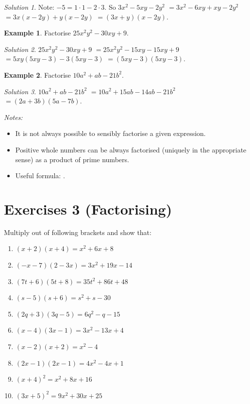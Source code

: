\documentclass[
  english,
  12pt,
  oneside]{book}
\providecommand{\tightlist}{%
  \setlength{\itemsep}{0pt}\setlength{\parskip}{0pt}}
\theoremstyle{definition}
\theoremstyle{definition}
\newtheorem{example}{Example}[chapter]
\theoremstyle{definition}
\theoremstyle{definition}
\theoremstyle{remark}
\newtheorem*{solution}{Solution}
\begin{document}
\begin{solution}
Note: \(-5=1\cdot 1-2\cdot 3\).
So \(3x^2-5xy-2y^2\) \(=3x^2- 6xy + xy-2y^2\) \(=3x(x-2y)+y(x-2y)\) \(=(3x+y)(x-2y)\).
\end{solution}

\begin{example}
Factorise \(25x^2y^2-30xy+9\).
\end{example}

\begin{solution}
\(25x^2y^2-30xy+9\) \(=25x^2y^2 -15xy -15xy +9\) \(=5xy(5xy-3)-3(5xy-3)\) \(=(5xy-3)(5xy-3)\).
\end{solution}

\begin{example}
Factorise \(10a^2+ab-21b^2\).
\end{example}

\begin{solution}
\(10a^2+ab-21b^2\) \(=10a^2 +15ab - 14ab -21b^2\) \(=(2a+3b)(5a-7b)\).
\end{solution}

\emph{Notes:}

\begin{itemize}
\tightlist
\item
  It is not always possible to sensibly factorise a given expression.
\item
  Positive whole numbers can be always factorised (uniquely in the appropriate sense) as a product of prime numbers.
\item
  Useful formula: .
\end{itemize}

\chapter*{Exercises 3 (Factorising)}\label{exercises-3-factorising}

Multiply out of following brackets and show that:

\begin{enumerate}
\def\labelenumi{\arabic{enumi}.}
\item
  \((x+2)(x+4) = x^2 + 6x + 8\)
\item
  \((-x-7)(2-3x)=3x^2+19x-14\)
\item
  \((7t+6)(5t+8)=35t^2+86t+48\)
\item
  \((s-5)(s+6) = s^2+s-30\)
\item
  \((2q+3)(3q-5)=6q^2-q-15\)
\item
  \((x-4)(3x-1) = 3x^2-13x +4\)
\item
  \((x-2)(x+2)=x^2-4\)
\item
  \((2x-1)(2x-1) = 4x^2-4x+1\)
\item
  \((x+4)^2 = x^2 + 8x + 16\)
\item
  \((3x+5)^2=9x^2+30x+25\)
\end{enumerate}
\end{document}
